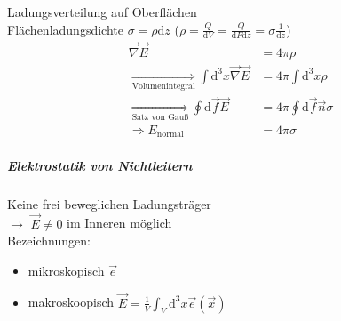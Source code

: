 \documentclass[a4paper]{article}
\begin{document}
Ladungsverteilung auf Oberflächen\\
Flächenladungsdichte $\sigma=\rho \mathrm{d}z$ ($\rho=\frac{Q}{\mathrm{d}V}=\frac{Q}{\mathrm{d}F
\mathrm{d}z}=\sigma \frac{1}{\mathrm{d}z}$)
\begin{align}
\vec{\nabla}\vec{E}&=4\pi\rho\\
\underset{\text{Volumenintegral}}{\Rightarrow}\int \mathrm{d}^3x \vec{\nabla}\vec{E}&=
4\pi \int \mathrm{d}^3x \rho\\
\underset{\text{Satz von Gauß}}{\Rightarrow}\oint \mathrm{d}\vec{f}\vec{E}&=4\pi\oint
\mathrm{d}\vec{f}\vec{n}\sigma\\
\Rightarrow E_{\text{normal}}&=4\pi\sigma 
\end{align}

\subparagraph{Elektrostatik von Nichtleitern}
Keine frei beweglichen Ladungsträger\\
$\rightarrow$ $\vec{E}\neq0$ im Inneren möglich\\
Bezeichnungen:
\begin{itemize}
  \item mikroskopisch $\vec{e}$
  \item makroskoopisch $\vec{E}=\frac{1}{V}\int_V \mathrm{d}^3x \vec{e}(\vec{x})$
\end{itemize}
\end{document}
